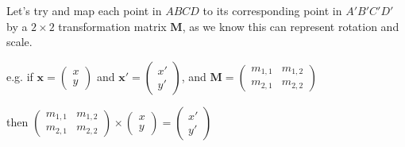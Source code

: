 Let's try and map each point in $ABCD$ to its corresponding point in $A'B'C'D'$ by a $2\times2$ transformation matrix $\bm{M}$, as we know this can represent rotation and scale.

e.g. if $\bm{x} = \begin{pmatrix} x \\ y \end{pmatrix}$ and $\bm{x'} = \begin{pmatrix} x' \\ y' \end{pmatrix}$, and $\bm{M} = \begin{pmatrix} m_{1,1} & m_{1,2} \\ m_{2,1} & m_{2,2} \end{pmatrix}$

then $\begin{pmatrix} m_{1,1} & m_{1,2} \\ m_{2,1} & m_{2,2} \end{pmatrix} \times \begin{pmatrix} x \\ y \end{pmatrix} = \begin{pmatrix} x' \\ y'  \end{pmatrix}$

